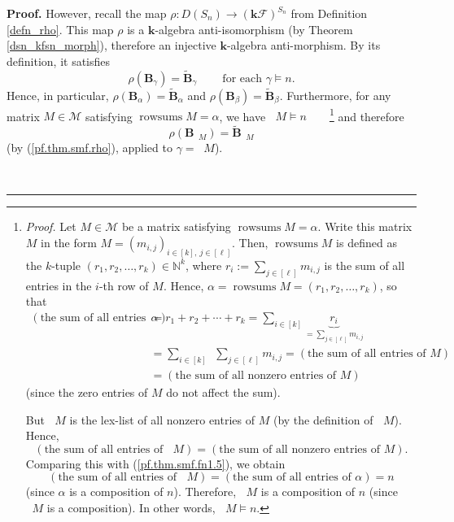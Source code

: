 \documentclass[12pt]{article}
\theoremstyle{definition}%
\theoremstyle{definition}%
\theoremstyle{remark}%
\newcommand{\interval}[1]{\left[ #1 \right]} %
\newcommand{\kk}{\mathbf{k}}
\newcommand{\kf}{\kk\mathcal{F}}
\newcommand{\dsn}{D\left(S_n\right)}
\newcommand{\BB}{\mathbf{B}}
\newcommand{\BBt}{\widetilde{\mathbf{B}}}
\newcommand{\CM}{\mathcal{M}}
\newcommand{\rowsums}{\operatorname{rowsums}}
\newcommand{\readb}{\mathop{\overline{\operatorname{read}}}}
\newenvironment{proof}[1][Proof]{\noindent\textbf{#1.} }{\ \rule{0.5em}{0.5em}}
\begin{document}
\begin{proof}
However, recall the map $\rho: \dsn \rightarrow\left(
\kf \right)  ^{S_{n}}$ from Definition \ref{defn_rho}. This
map $\rho$ is a $\kk$-algebra anti-isomorphism (by Theorem
\ref{dsn_kfsn_morph}), therefore an injective $\kk$-algebra
anti-morphism. By its definition, it satisfies
\begin{equation}
\rho\left(  \BB_{\gamma}\right)  =\BBt_{\gamma
}\ \ \ \ \ \ \ \ \ \ \text{for each }\gamma\models n.
\label{pf.thm.smf.rho}
\end{equation}
Hence, in particular, $\rho\left(  \BB_{\alpha}\right)
=\BBt_{\alpha}$ and $\rho\left(  \BB_{\beta}\right)
=\BBt_{\beta}$. Furthermore, for any matrix $M\in
\CM $ satisfying $\rowsums M=\alpha$, we have
$\readb M\models n$\ \ \ \ \footnote{\textit{Proof.}
Let $M\in\CM $ be a matrix satisfying $\rowsums M=\alpha
$. Write this matrix $M$ in the form $M=\left(  m_{i,j}\right)  _{i\in
\interval{k},\ j\in\interval{\ell}}$. Then, $\rowsums M$ is
defined as the $k$-tuple $\left(  r_{1},r_{2},\ldots,r_{k}\right)
\in\mathbb{N}^{k}$, where $r_{i}:=\sum_{j\in\interval{\ell}}m_{i,j}$ is
the sum of all entries in the $i$-th row of $M$. Hence, $\alpha
=\rowsums M=\left(  r_{1},r_{2},\ldots,r_{k}\right)  $, so that
\begin{align}
\left(  \text{the sum of all entries of }\alpha\right)   &  =r_{1}
+r_{2}+\cdots+r_{k}=\sum_{i\in\interval{k}  }
\underbrace{r_{i}}_{=\sum_{j\in\interval{\ell}}m_{i,j}}
\nonumber\\
&  =\sum_{i\in\interval{k}  }\ \ \sum_{j\in\interval{\ell}}
m_{i,j}=\left(  \text{the sum of all entries of }M\right)  \nonumber\\
&  =\left(  \text{the sum of all nonzero entries of }M\right)
\label{pf.thm.smf.fn1.5}
\end{align}
(since the zero entries of $M$ do not affect the sum).
\par
But $\readb M$ is the lex-list of all nonzero entries
of $M$ (by the definition of $\readb M$). Hence,
\[
\left(  \text{the sum of all entries of }\readb M\right)
=\left(  \text{the sum of all nonzero entries of }M\right)  .
\]
Comparing this with (\ref{pf.thm.smf.fn1.5}), we obtain
\[
\left(  \text{the sum of all entries of }\readb M\right)
=\left(  \text{the sum of all entries of }\alpha\right)  =n
\]
(since $\alpha$ is a composition of $n$). Therefore,
$\readb M$ is a composition of $n$ (since $\readb M$
is a composition). In other words,
$\readb M\models n$.} and therefore
\begin{equation}
\rho\left(  \BB_{\readb M}\right)
=\BBt_{\readb M}
\label{pf.thm.smf.rho-rM}
\end{equation}
(by (\ref{pf.thm.smf.rho}), applied to $\gamma=\readb M$).


\end{proof}
\end{document}

